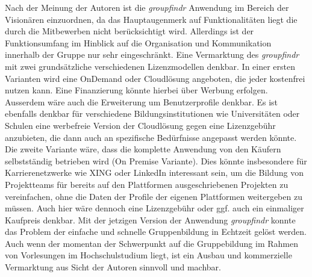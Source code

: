 Nach der Meinung der Autoren ist die \emph{groupfindr} Anwendung im Bereich der Visionären einzuordnen, da das Hauptaugenmerk auf Funktionalitäten liegt die durch die Mitbewerben nicht berücksichtigt wird. Allerdings ist der Funktionsumfang im Hinblick auf die Organisation und Kommunikation innerhalb der Gruppe nur sehr eingeschränkt.
\newline\newline
Eine Vermarktung des \emph{groupfindr} mit zwei grundsätzliche verschiedenen Lizenzmodellen denkbar. In einer ersten Varianten wird eine OnDemand oder Cloudlösung angeboten, die jeder kostenfrei nutzen kann. Eine Finanzierung könnte hierbei über Werbung erfolgen. Ausserdem wäre auch die Erweiterung um Benutzerprofile denkbar. Es ist ebenfalls denkbar für verschiedene Bildungsinstitutionen wie Universitäten oder Schulen eine werbefreie Version der Cloudlösung gegen eine Lizenzgebühr anzubieten, die dann auch an spezifische Bedürfnisse angepasst werden könnte. Die zweite Variante wäre, dass die komplette Anwendung von den Käufern selbstständig betrieben wird (On Premise Variante). Dies könnte insbesondere für Karrierenetzwerke wie XING oder LinkedIn interessant sein, um die Bildung von Projektteams für bereits auf den Plattformen ausgeschriebenen Projekten zu vereinfachen, ohne die Daten der Profile der eigenen Plattformen weitergeben zu müssen. Auch hier wäre dennoch eine Lizenzgebühr oder ggf. auch ein einmaliger Kaufpreis denkbar.
\newline\newline
Mit der jetzigen Version der Anwendung \emph{groupfindr} konnte das Problem der einfache und schnelle Gruppenbildung in Echtzeit gelöst werden. Auch wenn der momentan der Schwerpunkt auf die Gruppebildung im Rahmen von Vorlesungen im Hochschulstudium liegt, ist ein Ausbau und kommerzielle Vermarktung aus Sicht der Autoren sinnvoll und machbar.
